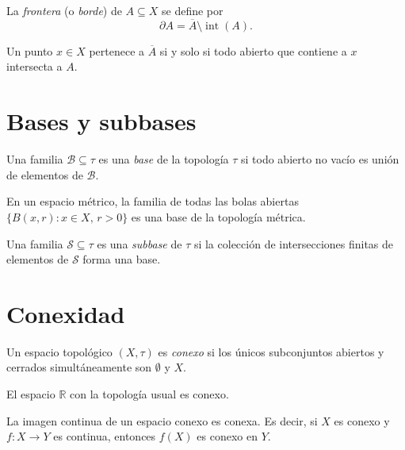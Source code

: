 \begin{definition}\label{def:frontera-top}
La \emph{frontera} (o \emph{borde}) de $A\subseteq X$ se define por
\[
  \partial A = \overline{A}\setminus\operatorname{int}(A).
\]
\end{definition}

\begin{proposition}\label{prop:carac-adherencia}
Un punto $x\in X$ pertenece a $\overline{A}$ si y solo si todo abierto que
contiene a $x$ intersecta a $A$.
\end{proposition}

\section{Bases y subbases}

\begin{definition}\label{def:base-top}
Una familia $\mathcal{B}\subseteq\tau$ es una \emph{base} de la topología
$\tau$ si todo abierto no vacío es unión de elementos de $\mathcal{B}$.
\end{definition}

\begin{example}\label{ej:base-metrica}
En un espacio métrico, la familia de todas las bolas abiertas
$\{B(x,r):x\in X,\,r>0\}$ es una base de la topología métrica.
\end{example}

\begin{definition}\label{def:subbase-top}
Una familia $\mathcal{S}\subseteq\tau$ es una \emph{subbase} de $\tau$ si la
colección de intersecciones finitas de elementos de $\mathcal{S}$ forma una base.
\end{definition}

\section{Conexidad}

\begin{definition}\label{def:conexo-top}
Un espacio topológico $(X,\tau)$ es \emph{conexo} si los únicos subconjuntos
abiertos y cerrados simultáneamente son $\emptyset$ y $X$.
\end{definition}

\begin{proposition}\label{prop:r-conexo}
El espacio $\mathbb{R}$ con la topología usual es conexo.
\end{proposition}

\begin{proposition}\label{prop:imagen-conexa-top}
La imagen continua de un espacio conexo es conexa. Es decir, si $X$ es conexo
y $f\colon X\to Y$ es continua, entonces $f(X)$ es conexo en $Y$.
\end{proposition}

